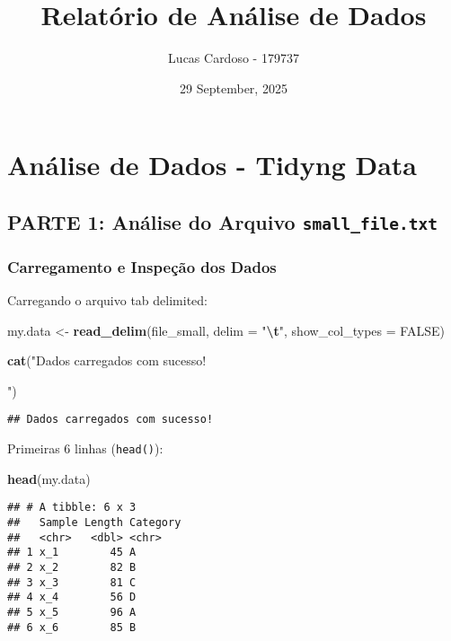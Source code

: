 \documentclass[
]{article}
\title{Relatório de Análise de Dados}
\author{Lucas Cardoso - 179737}
\date{29 September, 2025}
\newenvironment{Shaded}{\begin{snugshade}}{\end{snugshade}}
\newcommand{\AttributeTok}[1]{\textcolor[rgb]{0.13,0.29,0.53}{#1}}
\newcommand{\ConstantTok}[1]{\textcolor[rgb]{0.56,0.35,0.01}{#1}}
\newcommand{\FunctionTok}[1]{\textcolor[rgb]{0.13,0.29,0.53}{\textbf{#1}}}
\newcommand{\NormalTok}[1]{#1}
\newcommand{\OtherTok}[1]{\textcolor[rgb]{0.56,0.35,0.01}{#1}}
\newcommand{\SpecialCharTok}[1]{\textcolor[rgb]{0.81,0.36,0.00}{\textbf{#1}}}
\newcommand{\StringTok}[1]{\textcolor[rgb]{0.31,0.60,0.02}{#1}}
\begin{document}
\maketitle

{
\setcounter{tocdepth}{2}
\tableofcontents
}
\section{Análise de Dados - Tidyng
Data}\label{anuxe1lise-de-dados---tidyng-data}

\subsection{\texorpdfstring{PARTE 1: Análise do Arquivo
\texttt{small\_file.txt}}{PARTE 1: Análise do Arquivo small\_file.txt}}\label{parte-1-anuxe1lise-do-arquivo-small_file.txt}

\subsubsection{Carregamento e Inspeção dos
Dados}\label{carregamento-e-inspeuxe7uxe3o-dos-dados}

Carregando o arquivo tab delimited:

\begin{Shaded}
\begin{Highlighting}[]
\NormalTok{my.data }\OtherTok{\textless{}{-}} \FunctionTok{read\_delim}\NormalTok{(file\_small, }\AttributeTok{delim =} \StringTok{"}\SpecialCharTok{\textbackslash{}t}\StringTok{"}\NormalTok{, }\AttributeTok{show\_col\_types =} \ConstantTok{FALSE}\NormalTok{)}

\FunctionTok{cat}\NormalTok{(}\StringTok{"Dados carregados com sucesso!}

\StringTok{"}\NormalTok{)}
\end{Highlighting}
\end{Shaded}

\begin{verbatim}
## Dados carregados com sucesso!
\end{verbatim}

Primeiras 6 linhas (\texttt{head()}):

\begin{Shaded}
\begin{Highlighting}[]
\FunctionTok{head}\NormalTok{(my.data)}
\end{Highlighting}
\end{Shaded}

\begin{verbatim}
## # A tibble: 6 x 3
##   Sample Length Category
##   <chr>   <dbl> <chr>   
## 1 x_1        45 A       
## 2 x_2        82 B       
## 3 x_3        81 C       
## 4 x_4        56 D       
## 5 x_5        96 A       
## 6 x_6        85 B
\end{verbatim}
\end{document}

